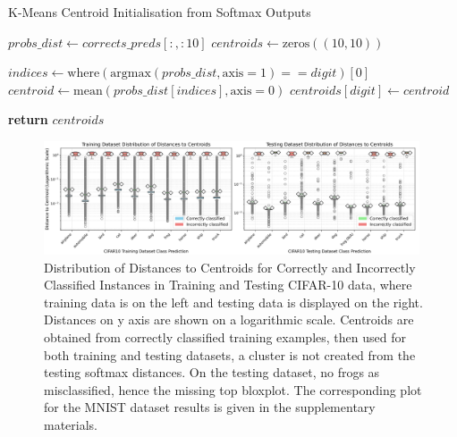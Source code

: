 \begin{algorithm}
\caption{K-Means Centroid Initialisation from Softmax Outputs}
\label{alg:k-means-centroid-init} 
\begin{algorithmic}[1]

\State $probs\_dist \gets corrects\_preds[:, :10]$ 
\State $centroids \gets \text{zeros}((10, 10))$ 

\State $indices \gets \text{where}(\text{argmax}(probs\_dist, \text{axis}=1) == digit)[0]$ 
\State $centroid \gets \text{mean}(probs\_dist[indices], \text{axis}=0)$ 
\State $centroids[digit] \gets centroid$ 
\EndFor

\State \textbf{return} $centroids$
\end{algorithmic}
\end{algorithm}



\begin{figure}[ht]
    \centering
    \includegraphics[width=0.99\textwidth]{Figures/CIFAR10_boxplots_side_by_side_x2.png}   \captionsetup{justification=raggedright,singlelinecheck=false}
    \caption{Distribution of Distances to Centroids for Correctly and Incorrectly Classified Instances in Training and Testing CIFAR-10 data, where training data is on the left and testing data is displayed on the right. Distances on y axis are shown on a logarithmic scale. Centroids are obtained from correctly classified training examples, then used for both training and testing datasets, a cluster is not created from the testing softmax distances. On the testing dataset, no frogs as misclassified, hence the missing top bloxplot. The corresponding plot for the MNIST dataset results is given in the supplementary materials.}
    \label{fig:CIFAR10_boxplots_side_by_side_x2}
\end{figure}

